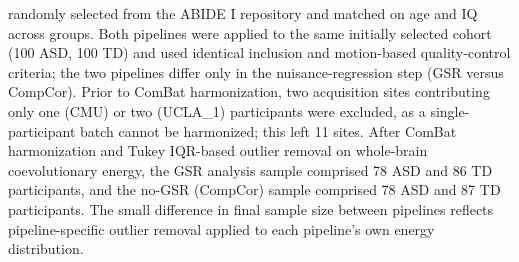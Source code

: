 \documentclass[10pt,letterpaper]{article}
\begin{document}
\begin{table}[H]
\begin{flushleft}
randomly selected from the ABIDE I repository and matched on age and IQ across groups. Both pipelines
were applied to the same initially selected cohort (100 ASD, 100 TD) and used identical inclusion and
motion-based quality-control criteria; the two pipelines differ only in the nuisance-regression step
(GSR versus CompCor). Prior to ComBat harmonization, two acquisition sites contributing only one
(CMU) or two (UCLA\_1) participants were excluded, as a single-participant batch cannot be
harmonized; this left 11 sites. After ComBat harmonization and Tukey IQR-based outlier removal on
whole-brain coevolutionary energy, the GSR analysis sample comprised 78 ASD and 86 TD participants,
and the no-GSR (CompCor) sample comprised 78 ASD and 87 TD participants. The small difference in
final sample size between pipelines reflects pipeline-specific outlier removal applied to each
pipeline's own energy distribution.
\end{flushleft}
\end{table}
\clearpage
\endgroup
\end{document}
